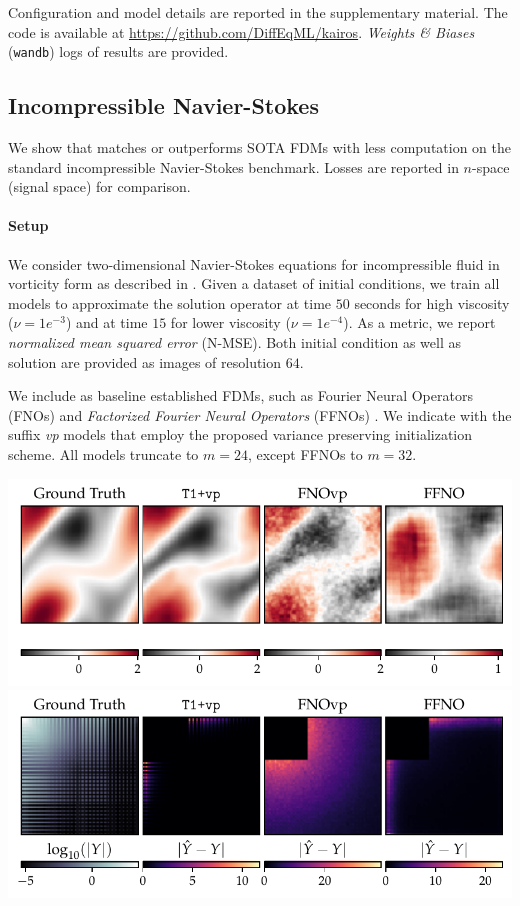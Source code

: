 Configuration and model details are reported in the supplementary material. The code is available at \url{https://github.com/DiffEqML/kairos}. \textit{Weights \& Biases} ({\tt wandb}) \citep{wandb} logs of results are provided. 


\subsection{Incompressible Navier-Stokes}\label{subsec:ns}
%
We show that \ourmethod{} matches or outperforms SOTA FDMs with less computation on the standard incompressible Navier-Stokes benchmark. Losses are reported in $n$-space (signal space) for comparison.

\paragraph{Setup}
We consider two-dimensional Navier-Stokes equations for incompressible fluid in vorticity form as described in \citep{li2020fourier}. Given a dataset of initial conditions, we train all models to approximate the solution operator at time $50$ seconds for high viscosity ($\nu = 1e^{-3}$) and at time $15$ for lower viscosity ($\nu = 1e^{-4}$). As a metric, we report \textit{normalized mean squared error} (N-MSE). Both initial condition as well as solution are provided as images of resolution $64$. 

We include as baseline established FDMs, such as Fourier Neural Operators (FNOs) \citep{li2020fourier} and \textit{Factorized Fourier Neural Operators} (FFNOs) \citep{tran2021factorized}. We indicate with the suffix \textit{vp} models that employ the proposed variance preserving initialization scheme. All models truncate to $m=24$, except FFNOs to $m=32$.

\begin{minipage}[t]{\linewidth}
    \centering
    \includegraphics[width=0.49\linewidth]{figures/navier_stokes_physical.pdf}
    \hfill
    \includegraphics[width=0.49\linewidth]{figures/navier_stokes_dct.pdf}
    \vspace{-3mm}
\label{fig:navier}
\end{minipage}

